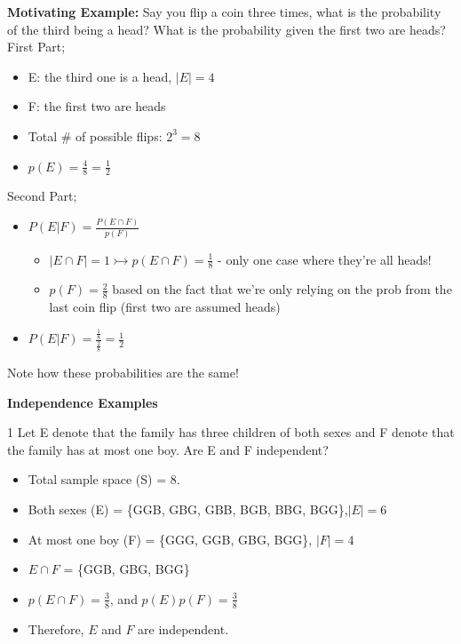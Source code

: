 \documentclass[12pt, letterpaper]{article}
\newcommand{\exheader}[1][ex]{{\tiny{#1}\normalsize}}
\begin{document}
\textbf{Motivating Example:} Say you flip a coin three times, what is the probability of the third being a head? What is the probability given the first two are heads? \\
First Part;
\begin{itemize}[leftmargin=*, label={}]
	\item E: the third one is a head, $|E| = 4$
	\item F: the first two are heads
	\item Total \# of possible flips: $2^3 = 8$
	\item $p(E) = \frac{4}{8} = \frac{1}{2}$
\end{itemize}
Second Part;
\begin{itemize}[leftmargin=*, label={}]
	\item $P(E|F) = \frac{P(E\cap F)}{p(F)}$
	\begin{itemize}
		\item $|E \cap F| = 1 \rightarrowtail p(E \cap F) = \frac{1}{8}$ - only one case where they're all heads!
		\item $p(F) = \frac{2}{8}$ based on the fact that we're only relying on the prob from the last coin flip (first two are assumed heads)
	\end{itemize}
	\item $P(E|F) = \frac{\frac{1}{8}}{\frac{2}{8}} = \frac{1}{2}$
\end{itemize}
Note how these probabilities are the same!


\pagebreak

\textbf{Independence Examples}
\bigbreak

\exheader[1] Let E denote that the family has three children of both sexes and F denote that the family has at most one boy. Are E and F independent? 
\begin{itemize}[leftmargin=*, label={}]
	\item Total sample space (S) = 8. 
	\item Both sexes (E) = \{GGB, GBG, GBB, BGB, BBG, BGG\},$ |E| = 6$
	\item At most one boy (F) = \{GGG, GGB, GBG, BGG\}, $|F| =4$
	\item $E \cap F$ = \{GGB, GBG, BGG\}
	\item $p(E \cap F) = \frac{3}{8}$, and $p(E)p(F) = \frac{3}{8}$
	\item Therefore, $E$ and $F$ are independent.
\end{itemize}

\bigbreak
\end{document}
